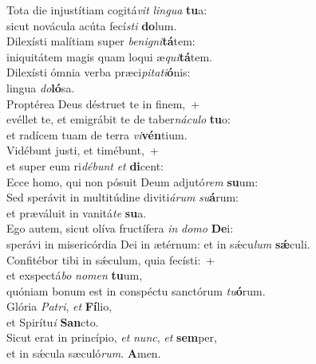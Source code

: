 \evenverse Tota die injustítiam cogitá\textit{vit} \textit{lin}\textit{gua} \textbf{tu}a:~\*\\
\evenverse sicut novácula acúta fecí\textit{sti} \textbf{do}lum.\\
\oddverse Dilexísti malítiam super \textit{be}\textit{ni}\textit{gni}\textbf{tá}tem:~\*\\
\oddverse iniquitátem magis quam loqui æ\textit{qui}\textbf{tá}tem.\\
\evenverse Dilexísti ómnia verba præci\textit{pi}\textit{ta}\textit{ti}\textbf{ó}nis:~\*\\
\evenverse lingua \textit{do}\textbf{ló}sa.\\
\oddverse Proptérea Deus déstruet te in finem,~+\\
\oddverse  evéllet te, et emigrábit te de taber\textit{ná}\textit{cu}\textit{lo} \textbf{tu}o:~\*\\
\oddverse et radícem tuam de terra \textit{vi}\textbf{vén}tium.\\
\evenverse Vidébunt justi, et timébunt,~+\\
\evenverse  et super eum ri\textit{dé}\textit{bunt} \textit{et} \textbf{di}cent:~\*\\
\evenverse Ecce homo, qui non pósuit Deum adjutó\textit{rem} \textbf{su}um:\\
\oddverse Sed sperávit in multitúdine diviti\textit{á}\textit{rum} \textit{su}\textbf{á}rum:~\*\\
\oddverse et præváluit in vanitá\textit{te} \textbf{su}a.\\
\evenverse Ego autem, sicut olíva fructífera \textit{in} \textit{do}\textit{mo} \textbf{De}i:~\*\\
\evenverse sperávi in misericórdia Dei in ætérnum: et in sǽcu\textit{lum} \textbf{sǽ}culi.\\
\oddverse Confitébor tibi in sǽculum, quia fecísti:~+\\
\oddverse  et exspectá\textit{bo} \textit{no}\textit{men} \textbf{tu}um,~\*\\
\oddverse quóniam bonum est in conspéctu sanctórum \textit{tu}\textbf{ó}rum.\\
\evenverse Glória \textit{Pa}\textit{tri}, \textit{et} \textbf{Fí}lio,~\*\\
\evenverse et Spirítu\textit{i} \textbf{San}cto.\\
\oddverse Sicut erat in princípio, \textit{et} \textit{nunc}, \textit{et} \textbf{sem}per,~\*\\
\oddverse et in sǽcula sæculó\textit{rum}. \textbf{A}men.\\
